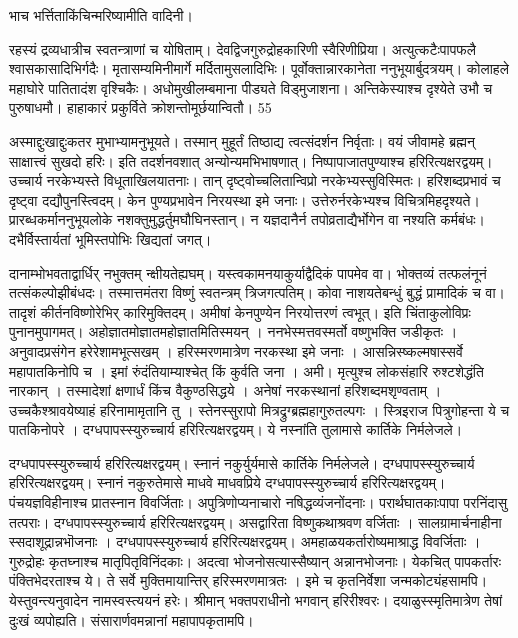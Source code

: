भाच भर्त्तिताकिंचिन्मरिष्यामीति वादिनी।

रहस्यं द्रव्यधात्रीच स्वतन्त्राणां च योषिताम्।
देवद्विजगुरुद्रोहकारिणी स्वैरिणीप्रिया।
अत्युत्कटैःपापफलै श्वासकासादिभिर्गदैः।
मृतासम्यमिनीमार्गे मर्दितामुसलादिभिः।
पूर्वोक्तान्नारकानेता ननुभूयार्बुदत्रयम्।
कोलाहले महाघोरे पातितादंश वृश्चिकैः।
अधोमुखीलम्बमाना पीड्यते विड्मुजाशना।
अन्तिकेस्याश्च दृश्येते उभौ च पुरुषाधमौ।
हाहाकारं प्रकुर्विते क्रोशन्तोमूर्छयान्वितौ।
55

अस्माद्दुःखाद्दुःकतर मुभाभ्यामनुभूयते।
तस्मान् मुहूर्तं तिष्ठाद्य त्वत्संदर्शन निर्वृताः।
वयं जीवामहे ब्रह्मन् साक्षात्त्वं सुखदो हरिः।
इति तदर्शनवशात् अन्योन्यमभिभाषणात्।
निष्पापाजातपुण्याश्च हरिरित्यक्षरद्वयम्।
उच्चार्य नरकेभ्यस्ते विधूताखिलयातनाः।
तान् दृष्ट्वोच्चलितान्विप्रो नरकेभ्यस्सुविस्मितः।
हरिशब्दप्रभावं च दृष्ट्वा दद्यौपुनस्त्विदम्।
केन पुण्यप्रभावेन निरयस्था इमे जनाः।
उत्तेरुर्नरकेभ्यश्च विचित्रमिहदृश्यते।
प्रारब्धकर्माननुभूयलोके नशक्तुमुद्धर्तुमघौघिनस्तान्।
न यज्ञदानैर्न तपोव्रताद्यैर्भोगेन वा नश्यति कर्मबंधः।
दभैर्विस्तार्यतां भूमिस्तपोभिः खिद्यतां जगत्।

दानाम्भोभवताद्वार्धिर् नभुक्तम् न्क्षीयतेह्यघम्।
यस्त्वकामनयाकुर्याद्वैदिकं पापमेव वा।
भोक्तव्यं तत्फलंनूनं तत्संकल्पोझीबंधदः।
तस्मात्तमंतरा विष्णुं स्वतन्त्रम् त्रिजगत्पतिम्।
कोवा नाशयतेबन्धुं बुद्धं प्रामादिकं च वा।
तादृशं कीर्तनविष्णोरेभिर् कारिमुक्तिदम्।
अमीषां केनपुण्येन निरयोत्तरणं त्वभूत्।
इति चिंताकुलोविप्रः पुनानमुपागमत्।
अहोज्ञातमोज्ञातमहोज्ञातमितिस्मयन् ।
ननभेस्मत्तवस्मर्तो वष्णुभक्ति जडीकृतः ।
अनुवादप्रसंगेन हरेरेशामभूत्सखम् ।
हरिस्मरणमात्रेण नरकस्था इमे जनाः ।
आसन्निस्ष्कल्मषास्सर्वे महापातकिनोपि च ।
इमां रुंदंतियाम्याश्चेत् किं कुर्वति जना ।
अमी।
मृत्युश्च लोकसंहारि रुश्टशेद्धंति नारकान् ।
तस्मादेशां क्षणार्धं किंच वैकुण्ठसिद्धये ।
अनेषां नरकस्थानां हरिशब्दमशृण्वताम् ।
उच्चकैश्श्रावयेष्याहं हरिनामामृतानि तु ।
स्तेनस्सुरापो मित्रद्रुग्ब्रह्महागुरुतल्पगः ।
स्त्रिइराज पित्रुगोहन्ता ये च पातकिनोपरे ।
दग्धपापस्स्युरुच्चार्य हरिरित्यक्षरद्वयम्।
ये नस्नांति तुलामासे कार्तिके निर्मलेजले।

दग्धपापस्स्युरुच्चार्य हरिरित्यक्षरद्वयम्।
स्नानं नकुर्युर्यमासे कार्तिके निर्मलेजले।
दग्धपापस्स्युरुच्चार्य हरिरित्यक्षरद्वयम्।
स्नानं नकुरुतेमासे माधवे माधवप्रिये दग्धपापस्स्युरुच्चार्य हरिरित्यक्षरद्वयम्।
पंचयज्ञविहीनाश्च प्रातस्नान विवर्जिताः।
अपुत्रिणोप्यनाचारो नषिद्धव्यंजनोंदनाः।
परार्थघातकाःपापा परनिंदासु तत्पराः।
दग्धपापस्स्युरुच्चार्य हरिरित्यक्षरद्वयम्।
असद्वारिता विष्णुकथाश्रवण वर्जिताः ।
सालग्रामार्चनाहीना स्सदाशूद्रान्नभॊजनाः ।
दग्धपापस्स्युरुच्चार्य हरिरित्यक्षरद्वयम्।
अमहाळयकर्तारोष्यमाश्राद्ध विवर्जिताः ।
गुरुद्रोहः कृतघ्नाश्च मातृपितृविनिंदकाः।
अदत्वा भोजनोसत्यास्सैष्यान् अन्नानभोजनाः।
येकचित् पापकर्तारः पंक्तिभेदरताश्च ये।
ते सर्वे मुक्तिमायान्तिर् हरिस्मरणमात्रतः ।
इमे च कृतनिर्वेशा जन्मकोट्यंहसामपि।
येस्तुवन्त्यनुवादेन नामस्वस्त्ययनं हरेः।
श्रीमान् भक्तपराधीनो भगवान् हरिरीश्वरः।
दयाळुस्स्मृतिमात्रेण तेषां दुःखं व्यपोह्यति।
संसारार्णवमन्नानां महापापकृतामपि।

